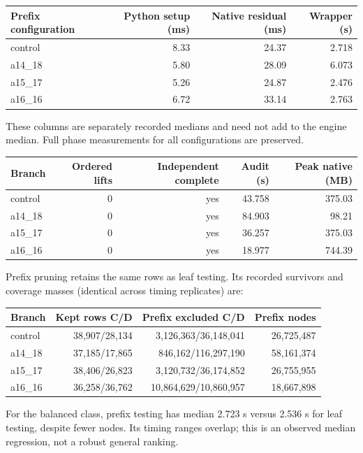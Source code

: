 \documentclass[11pt]{article}
\begin{document}
\begin{center}
\begin{tabular}{lrrr}
\toprule
Prefix configuration & Python setup (ms) & Native residual (ms) & Wrapper (s)\\
\midrule
control & 8.33 & 24.37 & 2.718\\
a14\_18 & 5.80 & 28.09 & 6.073\\
a15\_17 & 5.26 & 24.87 & 2.476\\
a16\_16 & 6.72 & 33.14 & 2.763\\
\bottomrule
\end{tabular}
\end{center}
These columns are separately recorded medians and need not add to the
engine median. Full phase measurements for all configurations are preserved.

\begin{center}
\begin{tabular}{lrrrr}
\toprule
Branch & Ordered lifts & Independent complete & Audit (s) & Peak native (MB)\\
\midrule
control & 0 & yes & 43.758 & 375.03\\
a14\_18 & 0 & yes & 84.903 & 98.21\\
a15\_17 & 0 & yes & 36.257 & 375.03\\
a16\_16 & 0 & yes & 18.977 & 744.39\\
\bottomrule
\end{tabular}
\end{center}
Prefix pruning retains the same rows as leaf testing. Its recorded
survivors and coverage masses (identical across timing replicates) are:
\begin{center}
\begin{tabular}{lrrr}
\toprule
Branch & Kept rows C/D & Prefix excluded C/D & Prefix nodes\\
\midrule
control & 38,907/28,134 & 3,126,363/36,148,041 & 26,725,487\\
a14\_18 & 37,185/17,865 & 846,162/116,297,190 & 58,161,374\\
a15\_17 & 38,406/26,823 & 3,120,732/36,174,852 & 26,755,955\\
a16\_16 & 36,258/36,762 & 10,864,629/10,860,957 & 18,667,898\\
\bottomrule
\end{tabular}
\end{center}
For the balanced class, prefix testing has median 2.723 s versus 2.536 s for leaf testing, despite fewer nodes. Its timing ranges overlap; this is an observed median regression, not a robust general ranking.
\end{document}
